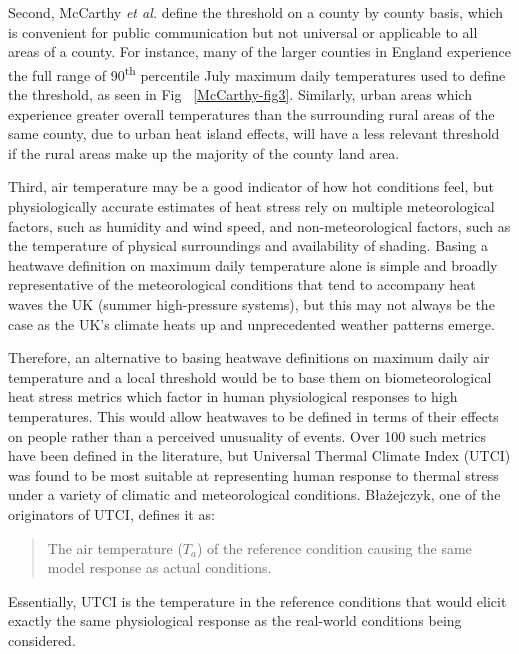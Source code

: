 \documentclass[10pt,letterpaper]{article}
\begin{document}
Second, McCarthy \textit{et al.} define the threshold on a county by county basis, which is convenient for public communication but not universal or applicable to all areas of a county.
For instance, many of the larger counties in England experience the full range of 90\textsuperscript{th} percentile July maximum daily temperatures used to define the threshold, as seen in Fig ~\ref{McCarthy-fig3}.\cite{McCarthy2019}
Similarly, urban areas which experience greater overall temperatures than the surrounding rural areas of the same county, due to urban heat island effects, will have a less relevant threshold if the rural areas make up the majority of the county land area.

Third, air temperature may be a good indicator of how hot conditions feel, but physiologically accurate estimates of heat stress rely on multiple meteorological factors, such as humidity and wind speed, and non-meteorological factors, such as the temperature of physical surroundings and availability of shading.
Basing a heatwave definition on maximum daily temperature alone is simple and broadly representative of the meteorological conditions that tend to accompany heat waves the UK (summer high-pressure systems), but this may not always be the case as the UK's climate heats up and unprecedented weather patterns emerge.

Therefore, an alternative to basing heatwave definitions on maximum daily air temperature and a local threshold would be to base them on biometeorological heat stress metrics which factor in human physiological responses to high temperatures.
This would allow heatwaves to be defined in terms of their effects on people rather than a perceived unusuality of events.
Over 100 such metrics have been defined in the literature, but Universal Thermal Climate Index (UTCI) was found to be most suitable at representing human response to thermal stress under a variety of climatic and meteorological conditions.\cite{Blazejczyk2012, DiNapoli2018, Zare2018}
Błażejczyk, one of the originators of UTCI, defines it as:
\begin{quote}
    The air temperature ($T_a$) of the reference condition causing the same model response as actual conditions.\cite{Blazejczyk2012}
\end{quote}
Essentially, UTCI is the temperature in the reference conditions that would elicit exactly the same physiological response as the real-world conditions being considered.
\end{document}

